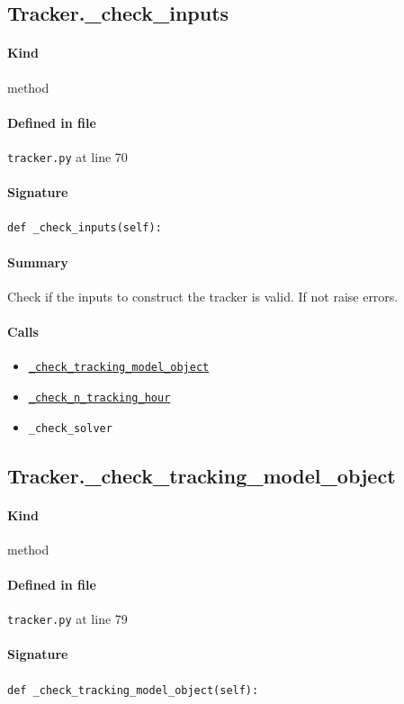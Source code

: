 \documentclass[11pt]{report}
\begin{document}
\subsection{Tracker.\_check\_inputs}
\label{def:tracker.py:Tracker._check_inputs:L70}
\paragraph{Kind} method
\paragraph{Defined in file} \texttt{tracker.py} at line 70
\paragraph{Signature} \texttt{def \_check\_inputs(self):}
\paragraph{Summary} Check if the inputs to construct the tracker is valid. If not raise errors.
\paragraph{Calls}
\begin{itemize}[leftmargin=*]
  \item \hyperref[def:tracker.py:Tracker._check_tracking_model_object:L79]{\texttt{\_check\_tracking\_model\_object}}
  \item \hyperref[def:tracker.py:Tracker._check_n_tracking_hour:L117]{\texttt{\_check\_n\_tracking\_hour}}
  \item \texttt{\_check\_solver}
\end{itemize}
\subsection{Tracker.\_check\_tracking\_model\_object}
\label{def:tracker.py:Tracker._check_tracking_model_object:L79}
\paragraph{Kind} method
\paragraph{Defined in file} \texttt{tracker.py} at line 79
\paragraph{Signature} \texttt{def \_check\_tracking\_model\_object(self):}
\end{document}
